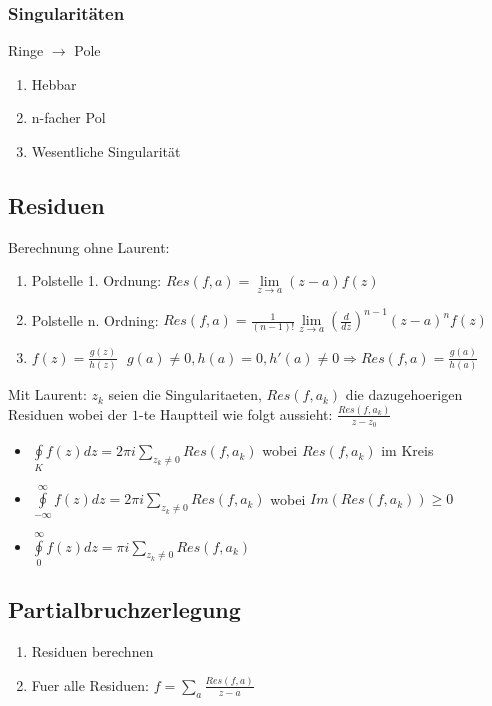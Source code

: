 \documentclass[10pt,a4paper]{article}
\begin{document}
\subsubsection{Singularitäten}
Ringe $\rightarrow$ Pole
\begin{enumerate}
 \item Hebbar
 \item n-facher Pol
 \item Wesentliche Singularität
\end{enumerate}

\subsection{Residuen}
Berechnung ohne Laurent:
\begin{enumerate}
\item Polstelle 1. Ordnung: $Res(f,a) = \lim\limits_{z\rightarrow a} (z-a)f(z)$
\item Polstelle n. Ordning: $Res(f,a) = \frac{1}{(n-1)!} \lim\limits_{z\rightarrow a} \left(\frac{d}{dz}\right)^{n-1} (z-a)^n f(z)$
\item $f(z)=\frac{g(z)}{h(z)} \,\,\,\, g(a) \neq 0, h(a) = 0, h'(a)\neq 0 \Rightarrow Res(f,a)=\frac{g(a)}{h(a)}$
\end{enumerate}

Mit Laurent:
$z_k$ seien die Singularitaeten, $Res(f, a_k)$ die dazugehoerigen Residuen wobei der $1$-te Hauptteil wie folgt aussieht: $\frac{Res(f, a_k)}{z-z_0}$
\begin{itemize}
\item $\oint\limits_{K} f(z) dz = 2 \pi i \sum\limits_{z_k \neq 0} Res(f, a_k)$ wobei $Res(f, a_k)$ im Kreis
\item $\oint\limits_{-\infty}^{\infty} f(z) dz = 2 \pi i \sum\limits_{z_k \neq 0} Res(f, a_k)$ wobei $Im(Res(f, a_k)) \geq 0$
\item $\oint\limits_{0}^{\infty} f(z) dz = \pi i \sum\limits_{z_k \neq 0} Res(f, a_k)$
\end{itemize}

\subsection{Partialbruchzerlegung}
\begin{enumerate}
\item Residuen berechnen
\item Fuer alle Residuen: $f = \sum\limits_a \frac{Res(f, a)}{z-a}$
\end{enumerate}
\end{document}
